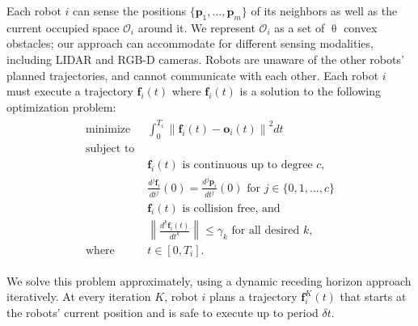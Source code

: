 \documentclass{svproc}
\newcommand{\Nora}[1] {\textbf{\textcolor{red}{#1}}}
\newcommand{\vp}{\mathbf{p}}
\newcommand{\vf}{\mathbf{f}}
\newcommand{\vo}{\mathbf{o}}
\newcommand{\cO}{\mathcal{O}}
\newcommand{\todo}[1]{\textbf{\textcolor{red}{TODO: #1}}}
\begin{document}
Each robot $i$ can sense the positions $\{\vp_1,\ldots,\vp_m\}$ of its neighbors as well as the current occupied space $\cO_i$ around it.
We represent $\cO_i$ as a set of $\uptheta$ convex obstacles; our approach can accommodate for different sensing modalities, including LIDAR and RGB-D cameras.
Robots are unaware of the other robots' planned trajectories, and cannot communicate with each other.
Each robot $i$ must execute a trajectory $\vf_i(t)$ where $\vf_i(t)$ is a solution to the following optimization problem:
\begin{align}
\begin{split}
    \text{minimize } & \int_{0}^{T_i}\left\|\vf_i(t)-\vo_i(t)\right\|^2 dt\\
    \text{subject to }& \\
    &\vf_i(t) \text{ is}\text{ continuous up to degree $c$},\\
    &\frac{d^j\vf_i}{dt^j}(0) = \frac{d^j\vp_i}{dt^j}(0)\text{ for } j\in\{0,1,...,c\}\\
    &\vf_i(t)\text{ is collision free, and}\\ 
    &\left\|\frac{d^k \vf_i(t)}{dt^k}\right\| \leq \gamma_k\text{ for all desired $k$},\\
    \text{where } & t\in [0,T_i].
\end{split}
\label{eq:problem:opt}
\end{align}

We solve this problem approximately, using a dynamic receding horizon approach iteratively.
At every iteration $K$, robot $i$ plans a trajectory $\vf^{K}_i(t)$ that starts at the robots' current position and is safe to execute up to period $\delta t$.

\end{document}
